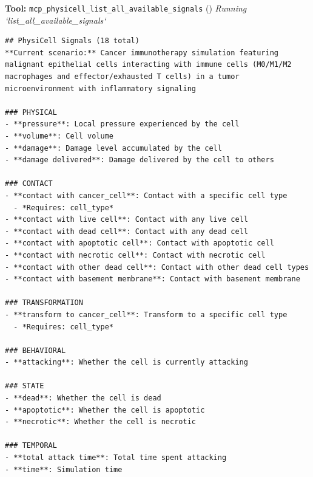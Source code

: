 \documentclass[11pt,a4paper]{article}
\begin{document}
\begin{toolokbox}
\textbf{Tool:} \texttt{mcp\_physicell\_list\_all\_available\_signals} (\checkmark)
\textit{Running `list\_all\_available\_signals`}
\begin{lstlisting}
## PhysiCell Signals (18 total)
**Current scenario:** Cancer immunotherapy simulation featuring malignant epithelial cells interacting with immune cells (M0/M1/M2 macrophages and effector/exhausted T cells) in a tumor microenvironment with inflammatory signaling

### PHYSICAL
- **pressure**: Local pressure experienced by the cell
- **volume**: Cell volume
- **damage**: Damage level accumulated by the cell
- **damage delivered**: Damage delivered by the cell to others

### CONTACT
- **contact with cancer_cell**: Contact with a specific cell type
  - *Requires: cell_type*
- **contact with live cell**: Contact with any live cell
- **contact with dead cell**: Contact with any dead cell
- **contact with apoptotic cell**: Contact with apoptotic cell
- **contact with necrotic cell**: Contact with necrotic cell
- **contact with other dead cell**: Contact with other dead cell types
- **contact with basement membrane**: Contact with basement membrane

### TRANSFORMATION
- **transform to cancer_cell**: Transform to a specific cell type
  - *Requires: cell_type*

### BEHAVIORAL
- **attacking**: Whether the cell is currently attacking

### STATE
- **dead**: Whether the cell is dead
- **apoptotic**: Whether the cell is apoptotic
- **necrotic**: Whether the cell is necrotic

### TEMPORAL
- **total attack time**: Total time spent attacking
- **time**: Simulation time


\end{lstlisting}
\end{toolokbox}
\end{document}
